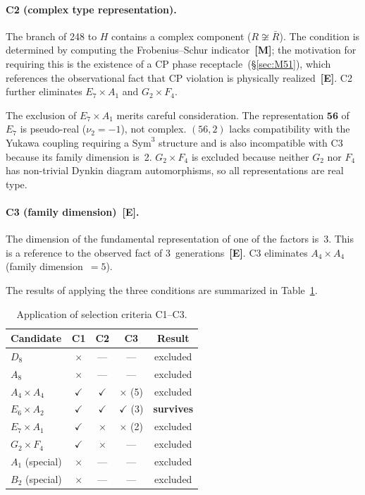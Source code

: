 \documentclass[sn-mathphys-num,Numbered]{sn-jnl}
\theoremstyle{thmstyleone}
\theoremstyle{thmstylethree}
\newcommand{\Sym}{\mathrm{Sym}}
\newcommand{\layerM}{\textbf{[M]}}
\newcommand{\layerE}{\textbf{[E]}}
\begin{document}
\paragraph{C2 (complex type representation).}
The branch of 248 to $H$ contains a complex component ($R \not\cong \bar{R}$).
The condition is determined by computing the Frobenius--Schur indicator~\layerM;
the motivation for requiring this is the existence of a CP phase
receptacle~(\S\ref{sec:M51}), which references the observational fact that CP
violation is physically realized~\layerE.  C2 further eliminates $E_7 \times
A_1$ and $G_2 \times F_4$.

The exclusion of $E_7 \times A_1$ merits careful consideration.  The
representation $\mathbf{56}$ of $E_7$ is pseudo-real ($\nu_2 = -1$), not complex.
$(56,2)$ lacks compatibility with the Yukawa coupling requiring a $\Sym^3$
structure and is also incompatible with C3 because its family dimension is~2.
$G_2 \times F_4$ is excluded because neither $G_2$ nor $F_4$ has non-trivial
Dynkin diagram automorphisms, so all representations are real type.

\paragraph{C3 (family dimension)~\layerE.}
The dimension of the fundamental representation of one of the factors is~3.
This is a reference to the observed fact of 3~generations~\layerE.  C3
eliminates $A_4 \times A_4$ (family dimension~$= 5$).

The results of applying the three conditions are summarized in
Table~\ref{tab:C123}.

\begin{table}[htb]
\centering
\caption{Application of selection criteria C1--C3.}\label{tab:C123}
\begin{tabular}{lcccc}
\toprule
Candidate & C1 & C2 & C3 & Result \\
\midrule
$D_8$ & $\times$ & --- & --- & excluded \\
$A_8$ & $\times$ & --- & --- & excluded \\
$A_4 \times A_4$ & $\checkmark$ & $\checkmark$ & $\times$ (5) & excluded \\
$E_6 \times A_2$ & $\checkmark$ & $\checkmark$ & $\checkmark$ (3) & \textbf{survives} \\
$E_7 \times A_1$ & $\checkmark$ & $\times$ & $\times$ (2) & excluded \\
$G_2 \times F_4$ & $\checkmark$ & $\times$ & --- & excluded \\
$A_1$ (special) & $\times$ & --- & --- & excluded \\
$B_2$ (special) & $\times$ & --- & --- & excluded \\
\bottomrule
\end{tabular}
\end{table}
\end{document}
